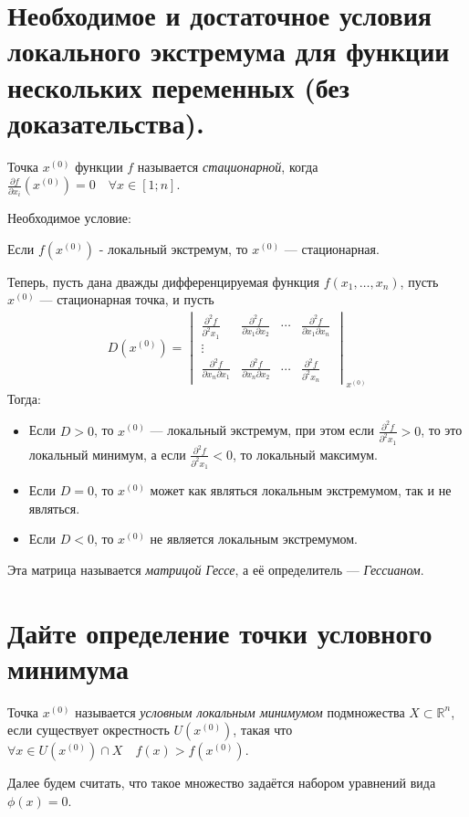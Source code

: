 \documentclass{article}
\begin{document}
\section{Необходимое и достаточное условия локального экстремума для функции нескольких переменных (без доказательства).}
\begin{definition}
	Точка $x^{(0)}$ функции $f$ называется \textit{стационарной}, когда $\frac{\partial f}{\partial x_i}(x^{(0)}) = 0 \quad\forall x \in [1;n]$.
\end{definition}
Необходимое условие:
\begin{theorem}
	Если $f(x^{(0)})$ - локальный экстремум, то $x^{(0)}$ --- стационарная.
\end{theorem}
\begin{theorem}
Теперь, пусть дана дважды дифференцируемая функция $f(x_1,\dotsc,x_n)$, пусть $x^{(0)}$ --- стационарная точка, и пусть
\begin{gather*}
    D(x^{(0)}) = \begin{vmatrix}
    \frac{\partial^2 f}{\partial^2 x_1} & \frac{\partial^2 f}{\partial x_1 \partial x_2} & \cdots & \frac{\partial^2 f}{\partial x_1 \partial x_n}\\
    \vdots\\
    \frac{\partial^2 f}{\partial x_n \partial x_1} & \frac{\partial^2 f}{\partial x_n \partial x_2} & \cdots & \frac{\partial^2 f}{\partial^2 x_n}
    \end{vmatrix}_{x^{(0)}}
\end{gather*}
Тогда:
\begin{itemize}
    \item Если $D>0$, то $x^{(0)}$ --- локальный экстремум, при этом если $\frac{\partial^2 f}{\partial^2 x_1}>0$, то это локальный минимум, а если $\frac{\partial^2 f}{\partial^2 x_1}<0$, то локальный максимум.
    \item Если $D=0$, то $x^{(0)}$  может как являться локальным экстремумом, так и не являться.
    \item Если $D<0$, то $x^{(0)}$ не является локальным экстремумом.
\end{itemize}
\end{theorem}
\begin{remark}
Эта матрица называется \textit{матрицой Гессе}, а её определитель --- \textit{Гессианом}.
\end{remark}

\section{Дайте определение точки условного минимума}
\begin{definition}
Точка $x^{(0)}$ называется \textit{условным локальным минимумом} подмножества $X \subset \mathbb{R}^n$, если существует окрестность $U(x^{(0)})$, такая что $\forall x \in U(x^{(0)}) \cap X \quad f(x) > f(x^{(0)})$.
\end{definition}
\begin{remark}
Далее будем считать, что такое множество задаётся набором уравнений вида $\phi(x)=0$.
\end{remark}
\end{document}
